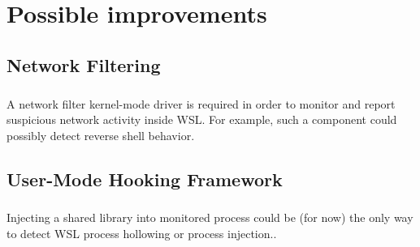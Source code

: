\chapter{Possible improvements}
    \section{Network Filtering}
        \paragraph{}
        A network filter kernel-mode driver is required in order to monitor and report suspicious network activity inside WSL. For example, such
        a component could possibly detect reverse shell behavior.
    \section{User-Mode Hooking Framework}
        \paragraph{}
        Injecting a shared library into monitored process could be (for now) the only way to detect WSL process hollowing or process injection..